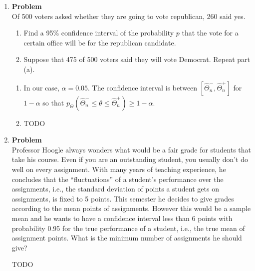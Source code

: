 \documentclass[12pt]{article}
\newenvironment{Ex}{\textbf{Problem}\vspace{.75em}\\}{}
\begin{document}
\begin{enumerate}
\begin{Ex}
\begin{solution}
\begin{enumerate}
      \end{enumerate}
    \end{solution}
  \end{Ex}
\item
  \begin{Ex}
    Of 500 voters asked whether they are going to vote republican, 260
    said yes.
    \begin{enumerate}
    \item Find a 95\% confidence interval of the probability $p$ that
      the vote for a certain office will be for the republican
      candidate.
    \item Suppose that 475 of 500 voters said they will vote
      Democrat. Repeat part (a).
    \end{enumerate}
    \begin{solution} \hfill
      \begin{enumerate}
      \item In our case, $\alpha = 0.05$. The confidence interval is
        between $[\hat{\Theta}_n^{-}, \hat{\Theta}_n^{+}]$ for
        $1-\alpha$ so that $p_{\Theta}(\hat{\Theta}_n^{-} \le \theta
        \le \hat{\Theta}_n^{+}) \ge 1-\alpha$.
      \item {\huge \color{red} TODO}
      \end{enumerate}
    \end{solution}
  \end{Ex}
\item
  \begin{Ex}
    Professor Hoogle always wonders what would be a fair grade for
    students that take his course. Even if you are an outstanding
    student, you usually don’t do well on every assignment. With many
    years of teaching experience, he concludes that the
    ``fluctuations'' of a student’s performance over the assignments,
    i.e., the standard deviation of points a student gets on
    assignments, is fixed to 5 points. This semester he decides to
    give grades according to the mean points of assignments. However
    this would be a sample mean and he wants to have a confidence
    interval less than 6 points with probability 0.95 for the true
    performance of a student, i.e., the true mean of assignment
    points. What is the minimum number of assignments he should give?
    \begin{solution} \hfill
      {\huge \color{red} TODO}
    \end{solution}
  \end{Ex}
\end{enumerate}
\end{document}
